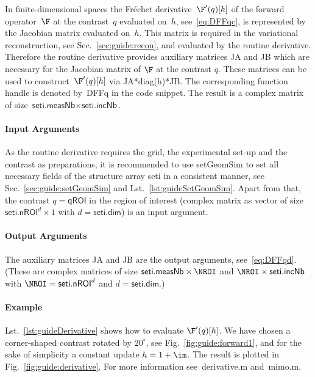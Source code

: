 \documentclass[a4paper]{article}
\begin{document}
In finite-dimensional spaces the Fr\'{e}chet derivative~$\F'(q)[h]$ of the forward operator~$\F$ at the contrast~$q$ evaluated on~$h$, see~\eqref{eq:DFFqc}, is represented by the Jacobian matrix evaluated on~$h$. This matrix is required in the variational reconstruction, see Sec.~\ref{sec:guide:recon}, and evaluated by the routine \textsf{derivative}.
%
Therefore the routine \textsf{derivative} provides auxiliary matrices \textsf{JA} and \textsf{JB} which are necessary for the Jacobian matrix of $\F$ at the contrast $q$. These matrices can be used to construct~$\F'(q)[h]$ via \textsf{JA*diag(h)*JB}. The corresponding function handle is denoted by~\textsf{DFFq} in the code snippet. The result is a complex matrix of size $\textsf{seti.measNb} \times \textsf{seti.incNb}$.

\paragraph{Input Arguments} As the routine \textsf{derivative} requires the grid, the experimental set-up and the contrast as preparations, it is recommended to use \textsf{setGeomSim} to set all necessary fields of the structure array \textsf{seti} in a consistent manner, see Sec.~\ref{sec:guide:setGeomSim} and Lst.~\ref{lst:guideSetGeomSim}. Apart from that, the contrast $q = \textsf{qROI}$ in the region of interest (complex matrix as vector of size $\textsf{seti.nROI}^d \times 1$ with $d = \textsf{seti.dim}$) is an input argument.

\paragraph{Output Arguments} The auxiliary matrices \textsf{JA} and \textsf{JB} are the output arguments, see~\eqref{eq:DFFqd}. (These are complex matrices of size $\textsf{seti.measNb} \times \NROI$ and $\NROI \times \textsf{seti.incNb}$ with $\NROI = \textsf{seti.nROI}^d$ and $d = \textsf{seti.dim}$.)

\paragraph{Example} Lst.~\ref{lst:guideDerivative} shows how to evaluate $\F'(q)[h]$. We have chosen a corner-shaped contrast rotated by $20^\circ$, see Fig.~\ref{fig:guide:forward1}, and for the sake of simplicity a constant update $h = 1 + \im$. The result is plotted in Fig.~\ref{fig:guide:derivative}. 
For more information see~\textsf{derivative.m} and~\textsf{mimo.m}. 
\end{document}
